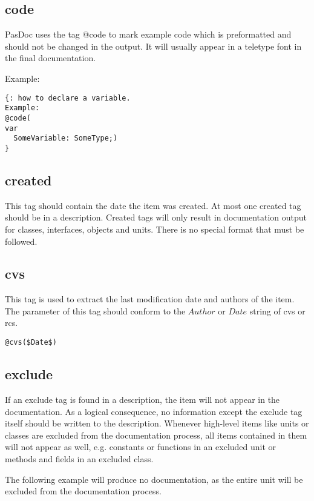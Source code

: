 \documentclass[11pt]{article}
\begin{document}
\subsection{code}

PasDoc uses the tag @code to mark example code which is preformatted and should 
not be changed in the output. It will usually appear in a teletype font in
the final documentation.

Example:
\begin{verbatim}
{: how to declare a variable.
Example:
@code(
var
  SomeVariable: SomeType;)
}
\end{verbatim}


\subsection{created}

This tag should contain the date the item was created.
At most one created tag should be in a description.
Created tags will only result in documentation output for
classes, interfaces, objects and units.
There is no special format that must be followed.

\subsection{cvs}

This tag is used to extract the last modification
date and authors of the item. The parameter of this
tag should conform to the $Author$ or $Date$ string
of cvs or rcs.

\begin{verbatim}
@cvs($Date$)
\end{verbatim}

\subsection{exclude}

If an exclude tag is found in a description, the item will not
appear in the documentation.
As a logical consequence, no information except the
exclude tag itself should be written to the description.
Whenever high-level items like units or classes are excluded from the
documentation process, all items contained in them will not appear as well,
e.g. constants or functions in an excluded unit or methods and fields in
an excluded class.

The following example will produce no documentation, as the entire unit
will be excluded from the documentation process.
\end{document}
